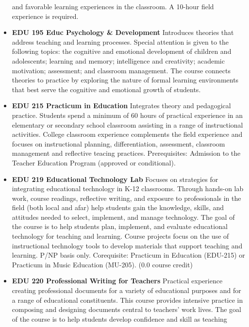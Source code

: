 \documentclass[
  letterpaper,
]{scrbook}
\begin{document}
\begin{itemize}
  and favorable learning experiences in the classroom. A 10-hour field
  experience is required.\\
\item
  \textbf{EDU 195 Educ Psychology \& Development} Introduces theories
  that address teaching and learning processes. Special attention is
  given to the following topics: the cognitive and emotional development
  of children and adolescents; learning and memory; intelligence and
  creativity; academic motivation; assessment; and classroom management.
  The course connects theories to practice by exploring the nature of
  formal learning environments that best serve the cognitive and
  emotional growth of students.\\
\item
  \textbf{EDU 215 Practicum in Education} Integrates theory and
  pedagogical practice. Students spend a minimum of 60 hours of
  practical experience in an elementary or secondary school classroom
  assisting in a range of instructional activities. College classroom
  experience complements the field experience and focuses on
  instructional planning, differentiation, assessment, classroom
  management and reflective teacing practices. Prerequisites: Admission
  to the Teacher Education Program (approved or conditional).\\
\item
  \textbf{EDU 219 Educational Technology Lab} Focuses on strategies for
  integrating educational technology in K-12 classrooms. Through
  hands-on lab work, course readings, reflective writing, and exposure
  to professionals in the field (both local and afar) help students gain
  the knowledge, skills, and attitudes needed to select, implement, and
  manage technology. The goal of the course is to help students plan,
  implement, and evaluate educational technology for teaching and
  learning. Course projects focus on the use of instructional technology
  tools to develop materials that support teaching and learning. P/NP
  basis only. Corequisite: Practicum in Education (EDU-215) or Practicum
  in Music Education (MU-205). (0.0 course credit)\\
\item
  \textbf{EDU 220 Professional Writing for Teachers} Practical
  experience creating professional documents for a variety of
  educational purposes and for a range of educational constituents. This
  course provides intensive practice in composing and designing
  documents central to teachers' work lives. The goal of the course is
  to help students develop confidence and skill as teaching

\end{itemize}
\end{document}
